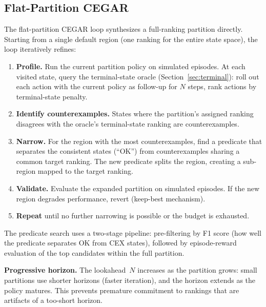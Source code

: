 \documentclass[9pt,a4paper]{article}
\theoremstyle{plain}
\theoremstyle{definition}
\theoremstyle{remark}
\begin{document}
\subsection{Flat-Partition CEGAR}
\label{sec:flat-cegar}

The flat-partition CEGAR loop synthesizes a full-ranking partition
directly. Starting from a single default region (one ranking for
the entire state space), the loop iteratively refines:

\begin{enumerate}
\item \textbf{Profile.} Run the current partition policy on
      simulated episodes. At each visited state, query the
      terminal-state oracle (Section~\ref{sec:terminal}):
      roll out each action with the current policy as follow-up
      for $N$ steps, rank actions by terminal-state penalty.

\item \textbf{Identify counterexamples.} States where the
      partition's assigned ranking disagrees with the oracle's
      terminal-state ranking are counterexamples.

\item \textbf{Narrow.} For the region with the most counterexamples,
      find a predicate that separates the consistent states
      (``OK'') from counterexamples sharing a common target
      ranking. The new predicate splits the region, creating a
      sub-region mapped to the target ranking.

\item \textbf{Validate.} Evaluate the expanded partition on
      simulated episodes. If the new region degrades performance,
      revert (keep-best mechanism).

\item \textbf{Repeat} until no further narrowing is possible or
      the budget is exhausted.
\end{enumerate}

The predicate search uses a two-stage pipeline: pre-filtering by
F1 score (how well the predicate separates OK from CEX states),
followed by episode-reward evaluation of the top candidates within
the full partition.

\textbf{Progressive horizon.} The lookahead~$N$ increases as the
partition grows: small partitions use shorter horizons (faster
iteration), and the horizon extends as the policy matures. This
prevents premature commitment to rankings that are artifacts of
a too-short horizon.
\end{document}
